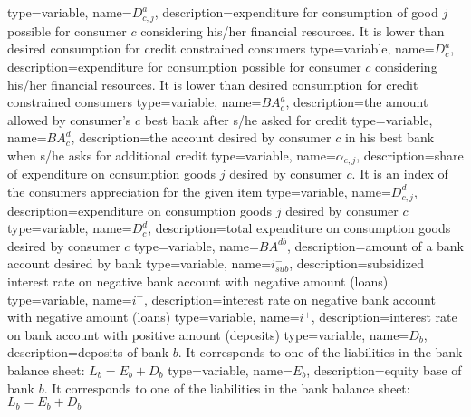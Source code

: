 {%
  type=variable,%
  name={$D^a_{c,j}$},%
  description={expenditure for consumption of good $j$ possible for consumer $c$ considering his/her financial resources. It is lower than desired consumption for credit constrained consumers} 
}
{%
  type=variable,%
  name={$D^a_{c}$},%
  description={expenditure for consumption possible for consumer $c$ considering his/her financial resources. It is lower than desired consumption for credit constrained consumers} 
}
{%
  type=variable,%
  name={$BA^a_{c}$},%
  description={the amount allowed by consumer's $c$ best bank after s/he asked for credit} 
}
{%
  type=variable,%
  name={$BA^d_{c}$},%
  description={the account desired by consumer $c$ in his best bank when s/he asks for additional credit} 
}
{%
  type=variable,%
  name={$\alpha_{c,j}$},%
  description={share of expenditure on consumption goods $j$ desired by consumer $c$. It is an index of the consumers appreciation for the given item} 
}
{%
  type=variable,%
  name={$D^{d}_{c,j}$},%
  description={expenditure on consumption goods $j$ desired by consumer $c$} 
}
{%
  type=variable,%
  name={$D^{d}_{c}$},%
  description={total expenditure on consumption goods desired by consumer $c$} 
}
{%
  type=variable,%
  name={$BA^{db}$},%
  description={amount of a bank account desired by bank} 
}
{%
  type=variable,%
  name={$i_{sub}^-$},%
  description={subsidized interest rate on negative bank account with negative amount (loans)} 
}
{%
  type=variable,%
  name={$i^-$},%
  description={interest rate on negative bank account with negative amount (loans)} 
}
{%
  type=variable,%
  name={$i^+$},%
  description={interest rate on bank account with positive amount (deposits)} 
}
{%
  type=variable,%
  name={$D_b$},%
  description={deposits of bank $b$. It corresponds to one of the liabilities in the bank balance sheet: $L_b=E_b+D_b$} 
}
{%
  type=variable,%
  name={$E_b$},%
  description={equity base of bank $b$. It corresponds to one of the liabilities in the bank balance sheet: $L_b=E_b+D_b$} 
}
